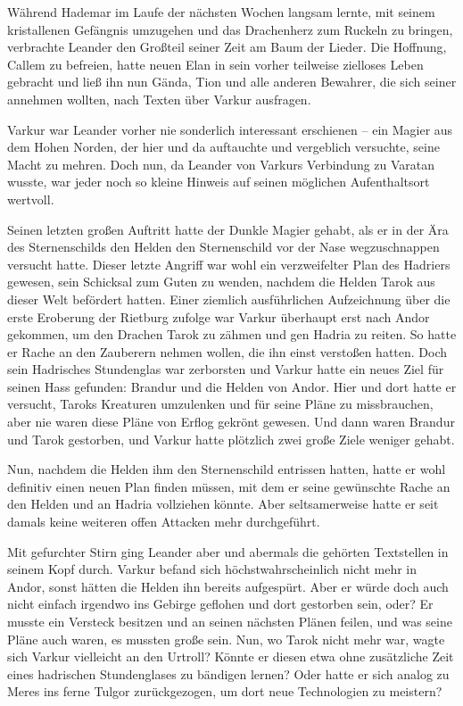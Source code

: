 \documentclass[10pt, a4paper, oneside]{book}
\begin{document}
Während Hademar im Laufe der nächsten Wochen langsam lernte, mit seinem kristallenen Gefängnis umzugehen und das Drachenherz zum Ruckeln zu bringen, verbrachte Leander den Großteil seiner Zeit am Baum der Lieder. Die Hoffnung, Callem zu befreien, hatte neuen Elan in sein vorher teilweise zielloses Leben gebracht und ließ ihn nun Gända, Tion und alle anderen Bewahrer, die sich seiner annehmen wollten, nach Texten über Varkur ausfragen.

Varkur war Leander vorher nie sonderlich interessant erschienen – ein Magier aus dem Hohen Norden, der hier und da auftauchte und vergeblich versuchte, seine Macht zu mehren. Doch nun, da Leander von Varkurs Verbindung zu Varatan wusste, war jeder noch so kleine Hinweis auf seinen möglichen Aufenthaltsort wertvoll.

Seinen letzten großen Auftritt hatte der Dunkle Magier gehabt, als er in der Ära des Sternenschilds den Helden den Sternenschild vor der Nase wegzuschnappen versucht hatte. Dieser letzte Angriff war wohl ein verzweifelter Plan des Hadriers gewesen, sein Schicksal zum Guten zu wenden, nachdem die Helden Tarok aus dieser Welt befördert hatten. Einer ziemlich ausführlichen Aufzeichnung über die erste Eroberung der Rietburg zufolge war Varkur überhaupt erst nach Andor gekommen, um den Drachen Tarok zu zähmen und gen Hadria zu reiten. So hatte er Rache an den Zauberern nehmen wollen, die ihn einst verstoßen hatten. Doch sein Hadrisches Stundenglas war zerborsten und Varkur hatte ein neues Ziel für seinen Hass gefunden: Brandur und die Helden von Andor. Hier und dort hatte er versucht, Taroks Kreaturen umzulenken und für seine Pläne zu missbrauchen, aber nie waren diese Pläne von Erflog gekrönt gewesen. Und dann waren Brandur und Tarok gestorben, und Varkur hatte plötzlich zwei große Ziele weniger gehabt.

Nun, nachdem die Helden ihm den Sternenschild entrissen hatten, hatte er wohl definitiv einen neuen Plan finden müssen, mit dem er seine gewünschte Rache an den Helden und an Hadria vollziehen könnte. Aber seltsamerweise hatte er seit damals keine weiteren offen Attacken mehr durchgeführt.

Mit gefurchter Stirn ging Leander aber und abermals die gehörten Textstellen in seinem Kopf durch. Varkur befand sich höchstwahrscheinlich nicht mehr in Andor, sonst hätten die Helden ihn bereits aufgespürt. Aber er würde doch auch nicht einfach irgendwo ins Gebirge geflohen und dort gestorben sein, oder? Er musste ein Versteck besitzen und an seinen nächsten Plänen feilen, und was seine Pläne auch waren, es mussten große sein. Nun, wo Tarok nicht mehr war, wagte sich Varkur vielleicht an den Urtroll? Könnte er diesen etwa ohne zusätzliche Zeit eines hadrischen Stundenglases zu bändigen lernen? Oder hatte er sich analog zu Meres ins ferne Tulgor zurückgezogen, um dort neue Technologien zu meistern?
\end{document}
